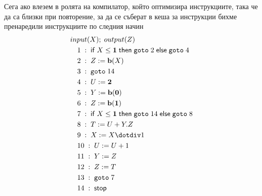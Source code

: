 \documentclass[14pt]{extarticle}
\begin{document}
Сега ако влезем в ролята на компилатор, който оптимизира инструкциите, така че да са близки при повторение, за да се съберат в кеша за инструкции бихме пренаредили инструкциите по следния начин
\begin{align*}
    & input(X); \; output(Z) \\
    & \quad 1 \; : \; \mathsf{if} \; X \;\mathbf{\leq}\; \mathbf 1 \; \mathsf{then} \; \mathtt{goto} \; 2  \; \mathsf{else} \; \mathtt{goto} \; 4 \\
    & \quad 2 \; : \; Z := \mathbf{b}(X) \\
    & \quad 3 \; : \; \mathtt{goto} \; 14 \\
    & \quad 4 \; : \; U := \mathbf 2 \\
    & \quad 5 \; : \; Y := \mathbf{b}(\mathbf 0) \\
    & \quad 6 \; : \; Z := \mathbf{b}(\mathbf 1) \\
    & \quad 7 \; : \; \mathsf{if} \; X \;\mathbf{\leq}\; \mathbf 1 \; \mathsf{then} \; \mathtt{goto} \; 14  \; \mathsf{else} \; \mathtt{goto} \; 8 \\
    & \quad 8 \; : \; T := U + Y.Z \\
    & \quad 9 \; : \; X := X \dotdiv 1 \\
    & \quad 10 \; : \; U := U + 1 \\
    & \quad 11 \; : \; Y := Z \\
    & \quad 12 \; : \; Z := T \\
    & \quad 13 \; : \; \mathtt{goto} \; 7 \\
    & \quad 14 \; : \; \mathsf{stop}
\end{align*}
\end{document}
